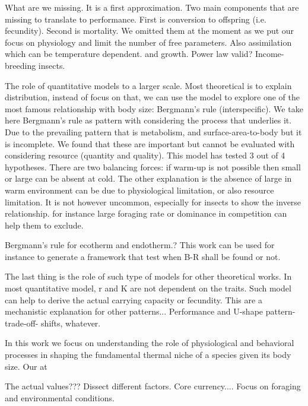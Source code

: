What are we missing.
It is a first approximation. 
Two main components that are missing to translate to performance.
First is conversion to offspring (i.e. fecundity).
Second is mortality.
We omitted them at the moment as we put our focus on physiology and limit the number of free parameters.
Also assimilation which can be temperature dependent.
and growth.
Power law valid?
Income-breeding insects.

The role of quantitative models to a larger scale.
Most theoretical is to explain distribution, instead of focus on that, we can use the model to explore one of the most famous relationship with body size: Bergmann's rule (interspecific).
We take here Bergmann's rule as pattern with considering the process that underlies it.
Due to the prevailing pattern that is metabolism, and surface-area-to-body but it is incomplete.
We found that these are important but cannot be evaluated with considering resource (quantity and quality).
This model has tested 3 out of 4 hypotheses.
There are two balancing forces: if warm-up is not possible then small or large can be absent at cold.
The other explanation is the absence of large in warm environment can be due to physiological limitation, or also resource limitation.
It is not however uncommon, especially for insects to show the inverse relationship.
for instance large foraging rate or dominance in competition can help them to exclude.

 Bergmann's rule for ecotherm and endotherm.?
 This work can be used for instance to generate a framework that test when B-R shall be found or not.
 
 The last thing is the role of such type of models for other theoretical works.
 In most quantitative model, r and K are not dependent on the traits.
 Such model can help to derive the actual carrying capacity or fecundity.
 This are a mechanistic explanation for other patterns...
 Performance and U-shape pattern-trade-off- shifts, whatever.
  
    

In this work we focus on understanding the role of physiological and behavioral processes in shaping the fundamental thermal niche of a species given its body size.
Our at

The actual values???
Dissect different factors.
Core currency....
Focus on foraging and environmental conditions.


